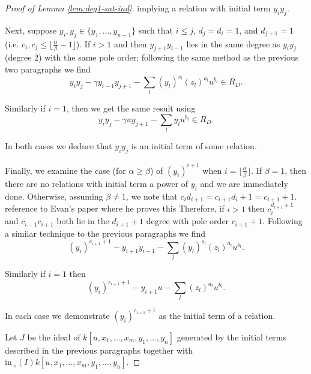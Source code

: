 \documentclass{amsart}
\theoremstyle{plain}
\theoremstyle{definition}
\theoremstyle{remark}
\numberwithin{equation}{section}
\newcommand \initial{\text{in}}
\begin{document}
\begin{proof}[Proof of Lemma \ref{lem:deg1-sat-ind}]
\noindent
implying a relation with initial term $y_i y_j$. 

Next, suppose $y_i, y_j \in \{y_1, \ldots , y_{n - 1}\}$ such that
$i \le j$, $d_j = d_i = 1$, and $d_{j + 1} = 1$ (i.e. $c_i, c_j \le
\lfloor \frac{\alpha}{\beta} - 1 \rfloor$). If $i > 1$ and then $y_
{j + 1} y_{i - 1}$ lies in the same degree as $y_i y_j$ (degree 2)
with the same pole order; following the same method as the previous
two paragraphs we find
\[
	y_i y_j - \gamma y_{i - 1} y_{j + 1} - \sum_{l} (y_l)^{s_l} (z_l)^{a_l}u^{b_l}\in R_D.
\]

\noindent
Similarly if $i = 1$, then we get the same result using
\[
	y_i y_j - \gamma u y_{j + 1} - \sum_l y_l u^{b_l} \in R_D.
\]

\noindent
In both cases we deduce that $y_i y_j$ is an initial term of some relation.


Finally, we examine the case (for $\alpha \ge \beta$) of $(y_i)^{i +
1}$ when $i = \lfloor \frac{\alpha}{\beta}\rfloor$. If $\beta = 1$,
then there are no relations with initial term a power of $y_i$
and we are immediately done. Otherwise, assuming $\beta \ne 1$, we
note that $c_i d_{i + 1} = c_{i + 1} d_i + 1 = c_{i + 1} + 1$. \todo
{reference to Evan's paper where he proves this} Therefore, if $i >
 1$ then $c_i^{d_{i + 1} + 1}$ and $c_{i - 1} c_{i + 1}$ both lie
in the $d_{i + 1} + 1$ degree with pole order $c_{i + 1} + 1$.
Following a similar technique to the previous paragraphs we find
\[
	(y_i)^{c_{i + 1} + 1} - y_{i + 1} y_{i - 1} - \sum_l (y_l)^{s_l}(z_l)^{a_l} u^{b_l}.
\]

\noindent
Similarly if $i = 1$ then
\[
	(y_i)^{c_{i + 1} + 1} - y_{i + 1}u - \sum_l (z_l)^{a_l} u^{b_l}.
\]

\noindent
In each case we demonstrate $(y_i)^{c_{i + 1} + 1}$ as the initial term of a relation. 

Let $J$ be the ideal of $k[u, x_1, \ldots, x_m, y_1, \ldots, y_n]$
generated by the initial terms described in the previous paragraphs
together with $\initial_\prec(I) k[u, x_1, \ldots, x_m, y_1, \ldots, y_n]$.


\end{proof}
\end{document}
